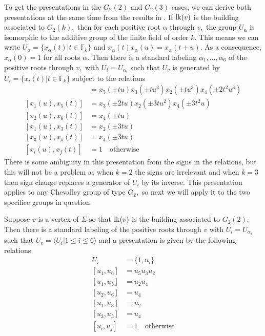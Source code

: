 \documentclass[class=book, crop=false,12 pt]{standalone}
\begin{document}
To get the presentations in the $G_2(2)$ and $G_2(3)$ cases, we can derive both presentations at the same time from the results in \cite{carter}. If $\mathrm{lk}(v)$ is the building associated to $G_2(k),$ then for each positive root $\alpha$ through $v,$ the group $U_\alpha$ is isomorphic to the additive group of the finite field of order $k.$ This means we can write $U_\alpha=\{x_\alpha(t)|t\in \mathbb{F}_k\}$ and $x_\alpha(t)x_\alpha(u)=x_\alpha(t+u).$ As a consequence, $x_\alpha(0)=1$ for all roots $\alpha.$ Then there is a standard labeling $\alpha_1,\dots,\alpha_6$ of the positive roots through $v,$ with $U_i=U_{\alpha_i}$ such that $U_v$ is generated by $U_i=\{x_i(t)|t\in\mathbb{F}_k\}$ subject to the relations
\begin{align*}
	[x_1(u),x_6(t)]&=x_5(\pm tu)x_3(\pm tu^2)x_2(\pm tu^3)x_4(\pm 2t^2u^3)\\
	[x_1(u),x_5(t)]&=x_3(\pm 2tu)x_2(\pm 3 tu^2)x_4(\pm 3t^2u)\\
	[x_2(u),x_6(t)]&=x_4(\pm tu)\\
	[x_1(u),x_3(t)]&=x_2(\pm 3tu)\\
	[x_3(u),x_5(t)]&=x_4(\pm 3tu)\\
	[x_i(u),x_j(t)]&=1 \quad \text{otherwise}
\end{align*}
There is some ambiguity in this presentation from the signs in the relations, but this will not be a problem as when $k=2$ the signs are irrelevant and when $k=3$ then sign change replaces a generator of $U_i$ by its inverse. This presentation applies to any Chevalley group of type $G_2,$ so next we will apply it to the two specifice groups in question.

\begin{lemma}
	\label{lem:g22pres}
	Suppose $v$ is a vertex of $\Sigma$ so that $\mathrm{lk}(v)$ is the building associated to $G_2(2).$ Then there is a standard labeling of the positive roots through $v$ with $U_i=U_{\alpha_i}$ such that $U_v=\langle U_i|1\le i\le 6\rangle$ and a presentation is given by the following relations
	\begin{align*}
		U_i&=\{1,u_i\}\\
		[u_1,u_6]&=u_5u_3u_2\\
		[u_1,u_5]&=u_2u_4\\
		[u_2,u_6]&=u_4\\
		[u_1,u_3]&=u_2\\
		[u_3,u_5]&=u_4\\
		[u_i,u_j]&=1\quad \text{otherwise}
	\end{align*}
\end{lemma}
\end{document}
